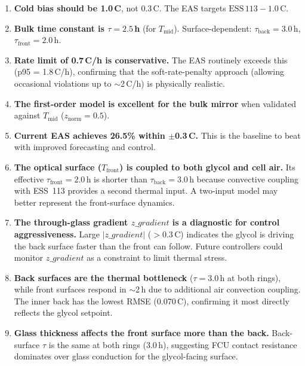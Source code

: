 \documentclass[11pt]{article}
\begin{document}
\begin{enumerate}
  \item \textbf{Cold bias should be 1.0\,\textdegree C}, not
    0.3\,\textdegree C.  The EAS targets $\mathrm{ESS\,113} - 1.0$\,\textdegree C.

  \item \textbf{Bulk time constant is $\tau = 2.5$\,h} (for $T_\mathrm{mid}$).
    Surface-dependent: $\tau_\mathrm{back} = 3.0$\,h,
    $\tau_\mathrm{front} = 2.0$\,h.

  \item \textbf{Rate limit of 0.7\,\textdegree C/h is conservative.}
    The EAS routinely exceeds this (p95 = 1.8\,\textdegree C/h),
    confirming that the soft-rate-penalty approach (allowing occasional
    violations up to $\sim$2\,\textdegree C/h) is physically realistic.

  \item \textbf{The first-order model is excellent for the bulk mirror}
    when validated against $T_\mathrm{mid}$ ($z_\mathrm{norm} = 0.5$).

  \item \textbf{Current EAS achieves 26.5\% within $\pm$0.3\,\textdegree C.}
    This is the baseline to beat with improved forecasting and control.

  \item \textbf{The optical surface ($T_\mathrm{front}$) is coupled to
    both glycol and cell air.}  Its effective $\tau_\mathrm{front} = 2.0$\,h
    is shorter than $\tau_\mathrm{back} = 3.0$\,h because convective
    coupling with ESS~113 provides a second thermal input.  A two-input
    model may better represent the front-surface dynamics.

  \item \textbf{The through-glass gradient $z\_gradient$ is a diagnostic
    for control aggressiveness.}  Large $|z\_gradient|$ ($> 0.3$\,\textdegree C)
    indicates the glycol is driving the back surface faster than the
    front can follow.  Future controllers could monitor $z\_gradient$
    as a constraint to limit thermal stress.

  \item \textbf{Back surfaces are the thermal bottleneck}
    ($\tau = 3.0$\,h at both rings), while front surfaces respond in
    $\sim$2\,h due to additional air convection coupling.  The inner
    back has the lowest RMSE (0.070\,\textdegree C), confirming it
    most directly reflects the glycol setpoint.

  \item \textbf{Glass thickness affects the front surface more than the
    back.}  Back-surface $\tau$ is the same at both rings (3.0\,h),
    suggesting FCU contact resistance dominates over glass conduction
    for the glycol-facing surface.
\end{enumerate}
\end{document}
